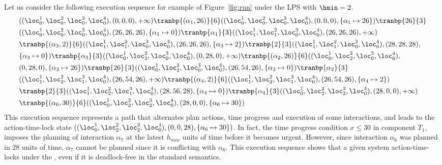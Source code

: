 \begin{example}
  \label{exp:dl}
  Let us consider the following execution sequence for example of Figure~\ref{fig:run} under the LPS with $\hmin = 2$. 
\begin{displaymath}
    \begin{split}
      &((\loc_0^1,\loc_0^2,\loc_0^3,\loc_0^4),(0,0,0),+\infty)\tranbp{(\alpha_1,26)}{6}((\loc_0^1,\loc_0^2,\loc_0^3,\loc_0^4),(0,0,0),\{\alpha_1\mapsto26\})\tranbp{26}{3}\\
      &((\loc_0^1,\loc_0^2,\loc_0^3,\loc_0^4),(26,26,26),\{\alpha_1\mapsto0\})\tranbp{\alpha_1}{3}((\loc_1^1,\loc_1^2,\loc_0^3,\loc_0^4),(26,26,26),+\infty)\\
      &\tranbp{(\alpha_3,2)}{6}((\loc_1^1,\loc_1^2,\loc_0^3,\loc_0^4),(26,26,26),\{\alpha_3\mapsto2\})\tranbp{2}{3}((\loc_1^1,\loc_1^2,\loc_0^3,\loc_0^4),(28,28,28),\\
      &\{\alpha_3\mapsto0\})\tranbp{\alpha_3}{3}((\loc_0^1,\loc_2^2,\loc_0^3,\loc_0^4),(0,28,0),+\infty)\tranbp{(\alpha_2,26)}{6}((\loc_0^1,\loc_2^2,\loc_0^3,\loc_0^4),\\
      &(0,28,0),\{\alpha_2\mapsto26\})\tranbp{26}{3}((\loc_0^1,\loc_2^2,\loc_0^3,\loc_0^4),(26,54,26),\{\alpha_2\mapsto0\})\tranbp{\alpha_2}{3}\\
      &((\loc_1^1,\loc_2^2,\loc_1^3,\loc_0^4),(26,54,26),+\infty)\tranbp{(\alpha_4,2)}{6}((\loc_1^1,\loc_2^2,\loc_1^3,\loc_0^4),(26,54,26),\{\alpha_4\mapsto2\})\\
      &\tranbp{2}{3}((\loc_1^1,\loc_2^2,\loc_1^3,\loc_0^4),(28,56,28),\{\alpha_4\mapsto0\})\tranbp{\alpha_4}{3}((\loc_0^1,\loc_2^2,\loc_2^3,\loc_0^4),(28,0,0),+\infty)\\
      &\tranbp{(\alpha_6,30)}{6}((\loc_0^1,\loc_2^2,\loc_2^3,\loc_0^4),(28,0,0),\{\alpha_6\mapsto30\}) 
    \end{split}
  \end{displaymath}
This execution sequence represents a path that alternates plan actions, time progress and execution of some interactions, and leads to the action-time-lock state
$((\loc_0^1,\loc_2^2,\loc_2^3,\loc_0^4),(0,0,28),\{\alpha_6\mapsto30\})$. In fact, the time progress condition $x\leq30$ in component $T_1$, imposes the 
planning of interaction $\alpha_7$ at the latest $h_{min}$ units of time before it becomes urgent. However, since interaction $\alpha_6$ was planned in
28 units of time, $\alpha_7$ cannot be planned since it is conflicting with $\alpha_6$.
This execution sequence shows that a given system action-time-locks under the \lps, even if it is deadlock-free in the standard semantics. 
\end{example}

